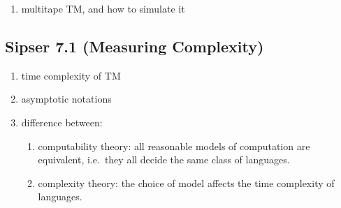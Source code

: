 \documentclass{article}
\begin{document}
\begin{enumerate}
  \item multitape TM, and how to simulate it
\end{enumerate}

\subsection{Sipser 7.1 (Measuring Complexity)}

\begin{enumerate}
  \item time complexity of TM
  \item asymptotic notations
  \item difference between:
  \begin{enumerate}
    \item computability theory: all reasonable models of computation are equivalent, i.e.\ they all decide the same class of languages.
    \item complexity theory: the choice of model affects the time complexity of languages.
  \end{enumerate}
\end{enumerate}
\end{document}
